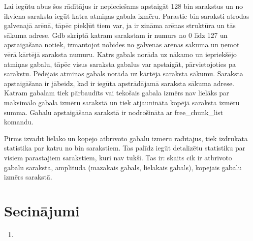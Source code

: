 Lai iegūtu abus šos rādītājus ir nepieciešams apstaigāt 128 bin sarakstus un no ikviena saraksta iegūt katra atmiņas gabala izmēru.
Parastie bin saraksti atrodas galvenajā arēnā, tāpēc piekļūt tiem var, ja ir zināma arēnas struktūra un tās sākuma adrese.
Gdb skriptā katram sarakstam ir numurs no 0 līdz 127 un apstaigāšana notiek, izmantojot nobīdes no galvenās arēnas sākuma un ņemot vērā kārtējā saraksta numuru.
Katrs gabals norāda uz nākamo un iepriekšējo atmiņas gabalu, tāpēc visus saraksta gabalus var apstaigāt, pārvietojoties pa sarakstu.
Pēdējais atmiņas gabals norāda uz kārtēja saraksta sākumu.
Saraksta apstaigāšana ir jābeidz, kad ir iegūta apstrādājamā saraksta sākuma adrese.
Katram gabalam tiek pārbaudīts vai tekošais gabala izmērs nav lielāks par maksimālo gabala izmēru sarakstā un tiek atjaunināta kopējā saraksta izmēru summa.
Gabalu apstaigāšana sarakstā ir nodrošināta ar free\_chunk\_list komandu.

Pirms izvadīt lielāko un kopējo atbrīvoto gabalu izmēru rādītājus, tiek izdrukāta statistika par katru no bin sarakstiem. 
Tas palīdz iegūt detalizētu statistiku par visiem parastajiem sarakstiem, kuri nav tukši.
Tas ir: skaits cik ir atbrīvoto gabalu sarakstā, amplitūda (mazākais gabals, lielākais gabals), kopējais gabalu izmērs sarakstā.


\section{Secinājumi}
\begin{enumerate}
\item 
\end{enumerate}


